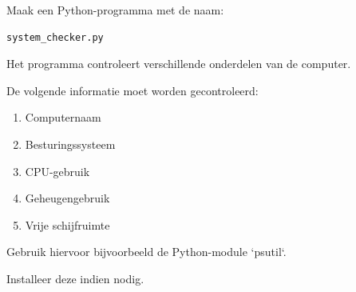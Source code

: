 Maak een Python-programma met de naam:
\begin{lstlisting}[language=bash]
system_checker.py
\end{lstlisting}

Het programma controleert verschillende onderdelen van de computer.

De volgende informatie moet worden gecontroleerd:
\begin{enumerate}
\item Computernaam
\item Besturingssysteem
\item CPU-gebruik
\item Geheugengebruik
\item Vrije schijfruimte
\end{enumerate}

Gebruik hiervoor bijvoorbeeld de Python-module `psutil`.

Installeer deze indien nodig.

